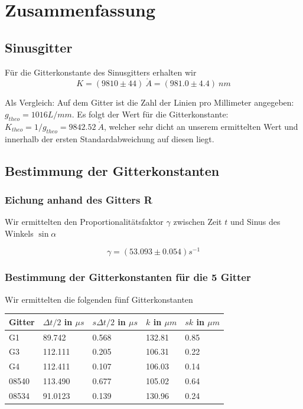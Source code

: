  \section{Zusammenfassung}

\subsection{Sinusgitter} %

Für die Gitterkonstante des Sinusgitters erhalten wir
$$\boxed{K=(9810 \pm 44) \ \mathring A = (981.0 \pm 4.4) \ nm}$$

Als Vergleich: Auf dem Gitter ist die Zahl der Linien pro Millimeter angegeben: \\ $g_{theo}=1016 L/mm$. Es folgt der Wert f\"ur die Gitterkonstante: $K_{theo} = 1/g_{theo} = 9842.52 \ \mathring A$, welcher sehr dicht an unserem ermittelten Wert und innerhalb der ersten Standardabweichung auf diesen liegt.

\subsection{Bestimmung der Gitterkonstanten}

\subsubsection{Eichung anhand des Gitters R}

Wir ermittelten den Proportionalitätsfaktor $\gamma$ zwischen Zeit $t$ und Sinus des Winkels $\sin \alpha$ 

$$ \gamma = (53.093 \pm 0.054) s^{-1} $$


\subsubsection{Bestimmung der Gitterkonstanten f\"ur die 5 Gitter}

Wir ermittelten die folgenden fünf Gitterkonstanten
\begin{center}
\begin{tabular}{lllll}
\toprule 
Gitter & $\Delta t /2$ in $\mu s$ & $s\Delta t /2$ in $\mu s$ & $k$ in $\mu m$ & $sk$ in $\mu m$\\
\midrule
G1 & 89.742 & 0.568 & 132.81 & 0.85\\
G3 & 112.111 & 0.205 & 106.31 & 0.22\\
G4 & 112.411 & 0.107 & 106.03 & 0.14\\
08540 & 113.490 & 0.677 & 105.02 & 0.64\\
08534 & 91.0123 & 0.139 & 130.96 & 0.24\\
\bottomrule
\end{tabular} 
\end{center}

